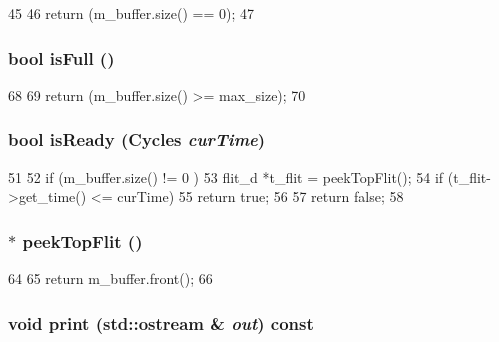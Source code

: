 \begin{DoxyCode}
45 {
46     return (m_buffer.size() == 0);
47 }
\end{DoxyCode}
\hypertarget{classflitBuffer__d_a3e70330939fdfc4dbc2f60c1a660584d}{
\subsubsection[{isFull}]{\setlength{\rightskip}{0pt plus 5cm}bool isFull ()}}
\label{classflitBuffer__d_a3e70330939fdfc4dbc2f60c1a660584d}



\begin{DoxyCode}
68 {
69     return (m_buffer.size() >= max_size);
70 }
\end{DoxyCode}
\hypertarget{classflitBuffer__d_ae19b07af91a49435139ba13f5665b239}{
\subsubsection[{isReady}]{\setlength{\rightskip}{0pt plus 5cm}bool isReady ({\bf Cycles} {\em curTime})}}
\label{classflitBuffer__d_ae19b07af91a49435139ba13f5665b239}



\begin{DoxyCode}
51 {
52     if (m_buffer.size() != 0 ) {
53         flit_d *t_flit = peekTopFlit();
54         if (t_flit->get_time() <= curTime)
55             return true;
56     }
57     return false;
58 }
\end{DoxyCode}
\hypertarget{classflitBuffer__d_ad04b660f0ff7b0e397beb261633f8b4e}{
\subsubsection[{peekTopFlit}]{$\ast$ peekTopFlit ()}}
\label{classflitBuffer__d_ad04b660f0ff7b0e397beb261633f8b4e}



\begin{DoxyCode}
64     {
65         return m_buffer.front();
66     }
\end{DoxyCode}
\hypertarget{classflitBuffer__d_ac55fe386a101fbae38c716067c9966a0}{
\subsubsection[{print}]{\setlength{\rightskip}{0pt plus 5cm}void print (std::ostream \& {\em out}) const}}
\label{classflitBuffer__d_ac55fe386a101fbae38c716067c9966a0}




